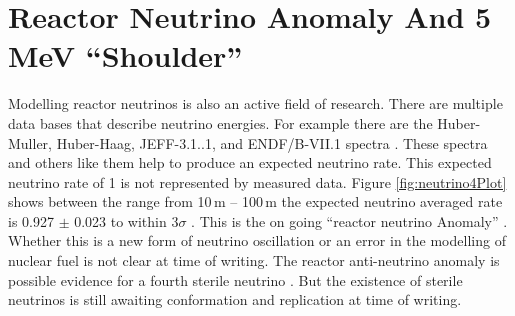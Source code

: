 \section{Reactor Neutrino Anomaly And 5\,MeV ``Shoulder''}
Modelling reactor neutrinos is also an active field of research. There are multiple data bases that describe neutrino energies. For example there are the Huber-Muller, Huber-Haag, JEFF-3.1..1, and ENDF/B-VII.1 spectra \cite{Hayes_implicationsShoulder_2015}. These spectra and others like them help to produce an expected neutrino rate. This expected neutrino rate of 1 is not represented by measured data. Figure \ref{fig:neutrino4Plot} shows between the range from 10\,m -- 100\,m the expected neutrino averaged rate is 0.927 $\pm$ 0.023 to within $3 \sigma$ \cite{neutrino4_2021}. This is the on going ``reactor neutrino Anomaly'' \cite{mention_anAnomaly_2011}. Whether this is a new form of neutrino oscillation or an error in the modelling of nuclear fuel is not clear at time of writing. The reactor anti-neutrino anomaly is possible evidence for a fourth sterile neutrino \cite{mention_anAnomaly_2011}. But the existence of sterile neutrinos is still awaiting conformation and replication at time of writing.
